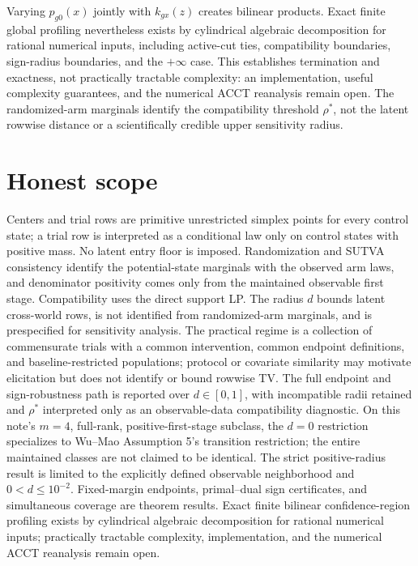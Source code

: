 \documentclass{article}
\begin{document}
Varying \(p_{g0}(x)\) jointly with \(k_{gx}(z)\) creates bilinear products. Exact finite global profiling nevertheless exists by cylindrical algebraic decomposition for rational numerical inputs, including active-cut ties, compatibility boundaries, sign-radius boundaries, and the \(+\infty\) case. This establishes termination and exactness, not practically tractable complexity: an implementation, useful complexity guarantees, and the numerical ACCT reanalysis remain open. The randomized-arm marginals identify the compatibility threshold \(\rho^*\), not the latent rowwise distance or a scientifically credible upper sensitivity radius.

\section{Honest scope}

Centers and trial rows are primitive unrestricted simplex points for every control state; a trial row is interpreted as a conditional law only on control states with positive mass. No latent entry floor is imposed. Randomization and SUTVA consistency identify the potential-state marginals with the observed arm laws, and denominator positivity comes only from the maintained observable first stage. Compatibility uses the direct support LP. The radius \(d\) bounds latent cross-world rows, is not identified from randomized-arm marginals, and is prespecified for sensitivity analysis. The practical regime is a collection of commensurate trials with a common intervention, common endpoint definitions, and baseline-restricted populations; protocol or covariate similarity may motivate elicitation but does not identify or bound rowwise TV. The full endpoint and sign-robustness path is reported over \(d\in[0,1]\), with incompatible radii retained and \(\rho^*\) interpreted only as an observable-data compatibility diagnostic. On this note's \(m=4\), full-rank, positive-first-stage subclass, the \(d=0\) restriction specializes to Wu--Mao Assumption 5's transition restriction; the entire maintained classes are not claimed to be identical. The strict positive-radius result is limited to the explicitly defined observable neighborhood and \(0<d\le10^{-2}\). Fixed-margin endpoints, primal--dual sign certificates, and simultaneous coverage are theorem results. Exact finite bilinear confidence-region profiling exists by cylindrical algebraic decomposition for rational numerical inputs; practically tractable complexity, implementation, and the numerical ACCT reanalysis remain open.
\end{document}
